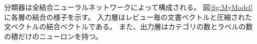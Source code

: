\documentclass{ttisummary}
\begin{document}
分類器は全結合ニューラルネットワークによって構成される。
図\ref{fig:MyModel}に各層の結合の様子を示す。
入力層はレビュー毎の文書ベクトルと圧縮された文ベクトルの結合ベクトルである。
また、出力層はカテゴリの数とラベルの数の積だけのニューロンを持つ。
\end{document}
